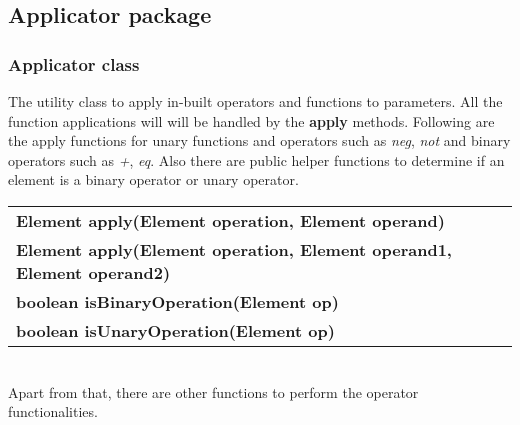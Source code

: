 \documentclass[12pt,a4paper]{article}
\begin{document}
\newpage

\subsection{Applicator package}

\subsubsection{Applicator class}

The utility class to apply in-built operators and functions to parameters. All the function applications will will be handled by the \textbf{apply} methods.
Following are the apply functions for unary functions and operators such as \textit{neg}, \textit{not} and binary operators such as \textit{+}, \textit{eq}. Also there are public helper functions to determine if an element is a binary operator or unary operator.\\

    \begin{tabular}{l}
        \textbf{Element apply(Element operation, Element operand)} \\
        \textbf{Element apply(Element operation, Element operand1, Element operand2)} \\
        \textbf{boolean isBinaryOperation(Element op)} \\
        \textbf{boolean isUnaryOperation(Element op)} \\
    \end{tabular} \\

Apart from that, there are other functions to perform the operator functionalities. \\
\end{document}
